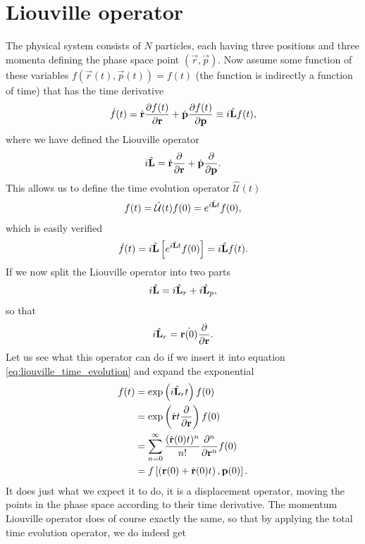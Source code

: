 \section{Liouville operator}
\label{sec:liouville_operator}
The physical system consists of $N$ particles, each having three positions and three momenta defining the phase space point $(\vec r, \vec p)$. Now assume some function of these variables $f(\vec r(t), \vec p(t)) = f(t)$ (the function is indirectly a function of time) that has the time derivative
\begin{align}
	\dot f(t) = \dot {\mathbf r}\frac{\partial f(t)}{\partial \mathbf r} + \dot {\mathbf p}\frac{\partial f(t)}{\partial \mathbf p} \equiv i\hat{\mathbf L} f(t),
\end{align}
where we have defined the Liouville operator
\begin{align}
	i\hat{\mathbf L} = \dot{\mathbf r}\frac{\partial }{\partial \mathbf r} + \dot{\mathbf p}\frac{\partial }{\partial \mathbf p}.
\end{align}
This allows us to define the time evolution operator $\hat{\mathcal U}(t)$
\begin{align}
	\label{eq:liouville_time_evolution}
	f(t) = \hat{\mathcal U}(t)f(0) = e^{i\hat{\mathbf L} t}f(0),
\end{align}
which is easily verified
\begin{align}
	\dot f(t) = i\hat{\mathbf L} \left[e^{i\hat{\mathbf L} t}f(0)\right] = i\hat{\mathbf L} f(t).
\end{align}
If we now split the Liouville operator into two parts
\begin{align}
	i\hat{\mathbf L} = i\hat{\mathbf L}_r + i\hat{\mathbf L}_p,
\end{align}
so that
\begin{align}
	i\hat{\mathbf L}_r = \dot{\mathbf r(0)}\frac{\partial }{\partial \mathbf r}.
\end{align}
Let us see what this operator can do if we insert it into equation \eqref{eq:liouville_time_evolution} and expand the exponential
\begin{align}
	f(t) &= \exp\left(i\hat{\mathbf L}_r t\right) f(0)\\
	&= \exp\left(\dot{\mathbf r}t\frac{\partial }{\partial \mathbf r}\right)f(0)\\
	&= \sum_{n=0}^\infty \frac{(\dot{\mathbf r}(0)t)^n}{n!}\frac{\partial^n}{\partial \mathbf r^n} f(0)\\
	&= f\left[\left(\mathbf r(0) + \dot{\mathbf r}(0)t\right), \mathbf p(0)\right].
\end{align}
It does just what we expect it to do, it is a displacement operator, moving the points in the phase space according to their time derivative. The momentum Liouville operator does of course exactly the same, so that by applying the total time evolution operator, we do indeed get
